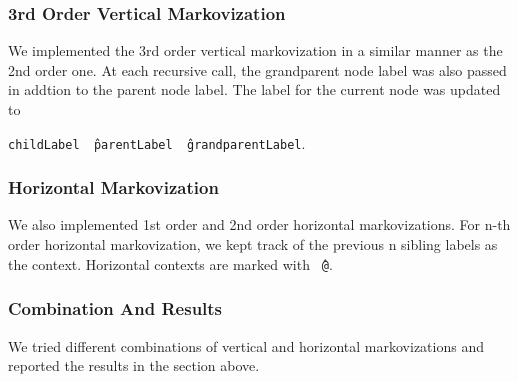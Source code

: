 \documentclass[12pt]{article}
\begin{document}
\subsubsection{3rd Order Vertical Markovization}
We implemented the 3rd order vertical markovization in a similar manner as the 2nd order one. At each recursive call, the grandparent node label was also passed in addtion to the parent node label. The label for the current node was updated to

\texttt{childLabel \^\ parentLabel \^\ grandparentLabel}. 
\subsubsection{Horizontal Markovization}
We also implemented 1st order and 2nd order horizontal markovizations. For n-th order horizontal markovization, we kept track of the previous n sibling labels as the context. Horizontal contexts are marked with \texttt{\^\ @}.
\subsubsection{Combination And Results}
We tried different combinations of vertical and horizontal markovizations and reported the results in the section above. 
\end{document}
